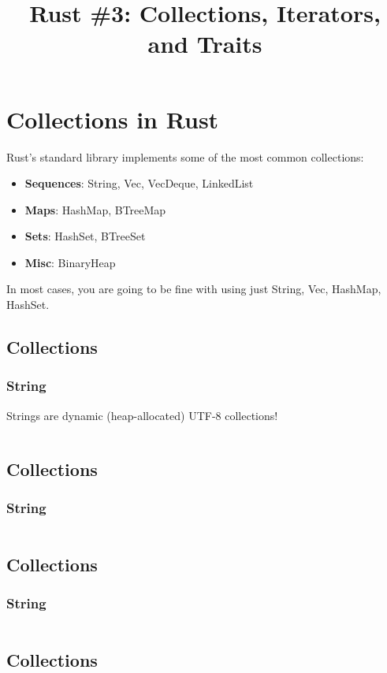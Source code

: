 \documentclass[usenames,twocolumn,dvipsnames,10pt,a4wide]{article}
\title{Rust \#3: Collections, Iterators, and Traits}
\begin{document}
\maketitle


\section{Collections in Rust}
	Rust's standard library implements some of
	the most common collections:
\begin{itemize}[label=$\bullet$]
	\item \textbf{Sequences}: String, Vec, VecDeque, LinkedList
	\item \textbf{Maps}: HashMap, BTreeMap
	\item \textbf{Sets}: HashSet, BTreeSet
	\item \textbf{Misc}: BinaryHeap
\end{itemize}
	In most cases, you are going to be fine with
	using just String, Vec, 
	HashMap, HashSet.


\subsection{Collections}
	\subsubsection{String}
	Strings are dynamic (heap-allocated) UTF-8 collections!
	\inputminted[fontsize=\normalsize]{rust}{code/string.rs}


\subsection{Collections}
	\subsubsection{String}
	\inputminted[fontsize=\normalsize]{rust}{code/string1.rs}


\subsection{Collections}
	\subsubsection{String}
	\inputminted[fontsize=\normalsize]{rust}{code/string2.rs}


\subsection{Collections}
\end{document}
